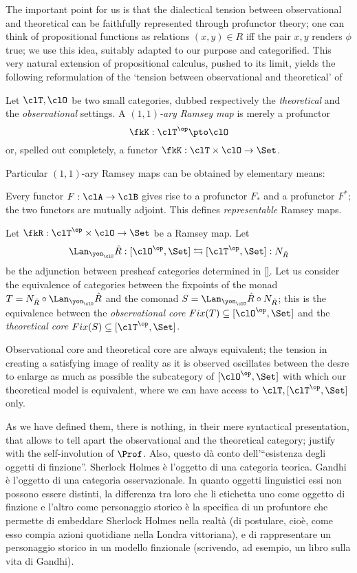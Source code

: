\documentclass[a4paper]{../birkjour}
\begin{document}
The important point for us is that the dialectical tension between observational and theoretical can be faithfully represented through profunctor theory; one can think of propositional functions as relations $(x,y)\in R$ iff the pair $x,y$ renders $\phi$ true; we use this idea, suitably adapted to our purpose and categorified. This very natural extension of propositional calculus, pushed to its limit, yields the following reformulation of the `tension between observational and theoretical' of \cite{u,v,w}
\begin{definition}
  Let $\clT,\clO$ be two small categories, dubbed respectively the \emph{theoretical} and the \emph{observational} settings. A \emph{$(1,1)$-ary Ramsey map} is merely a profunctor 
  \[\fkK : \clT^\op \pto \clO\]
  or, spelled out completely, a functor $\fkK : \clT\times \clO \to \Set$.
\end{definition}
Particular $(1,1)$-ary Ramsey maps can be obtained by elementary means:
\begin{example}
 Every functor $F : \clA \to \clB$ gives rise to a profunctor $F_*$ and a profunctor $F^*$; the two functors are mutually adjoint. This defines \emph{representable} Ramsey maps. 
\end{example}
\begin{definition}
  Let $\fkR : \clT^\op\times \clO \to\Set$ be a Ramsey map. Let 
  \[ \Lan_{\yon_\clO}\hat R : [\clO^\op,\Set] \leftrightarrows [\clT^\op,\Set] : N_{\hat R} \]
  be the adjunction between presheaf categories determined in \autoref{}. Let us consider the equivalence of categories between the fixpoints of the monad $T = N_{\hat R}\circ\Lan_{\yon_\clO}\hat R$ and the comonad $S=\Lan_{\yon_\clO}\hat R\circ N_{\hat R}$; this is the equivalence between the \emph{observational core} $Fix(T)\subseteq [\clO^\op,\Set]$ and the \emph{theoretical core} $Fix(S)\subseteq [\clT^\op,\Set]$.
\end{definition}
\begin{remark}
Observational core and theoretical core are always equivalent; the tension in creating a satisfying image of reality as it is observed oscillates between the desre to enlarge as much as possible the subcategory of $[\clO^\op,\Set]$ with which our theoretical model is equivalent, where we can have access to $\clT, [\clT^\op, \Set]$ only.
\end{remark}
As we have defined them, there is nothing, in their mere syntactical presentation, that allows to tell apart the observational and the theoretical category; justify with the self-involution of $\Prof$. Also, questo dà conto dell'``esistenza degli oggetti di finzione''. Sherlock Holmes è l'oggetto di una categoria teorica. Gandhi è l'oggetto di una categoria osservazionale. In quanto oggetti linguistici essi non possono essere distinti, la differenza tra loro che li etichetta uno come oggetto di finzione e l'altro come personaggio storico è la specifica di un profuntore che permette di embeddare Sherlock Holmes nella realtà (di postulare, cioè, come esso compia azioni quotidiane nella Londra vittoriana), e di rappresentare un personaggio storico in un modello finzionale (scrivendo, ad esempio, un libro sulla vita di Gandhi).
\end{document}
